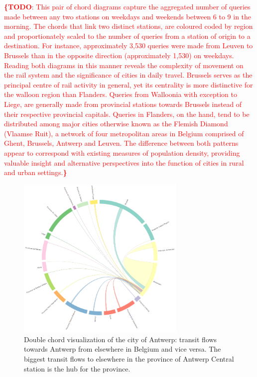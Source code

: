 \documentclass{sig-alternate}
\newcommand{\todo}[1]{\noindent\textcolor{red}{{\bf \{TODO}: #1{\bf \}}}}
\begin{document}
\todo{This pair of chord diagrams capture the aggregated number of queries made between any two stations on weekdays and weekends between 6 to 9 in the morning. The chords that link two distinct stations, are coloured coded by region and proportionately scaled to the number of queries from a station of origin to a destination. For instance, approximately 3,530 queries were made from Leuven to Brussels than in the opposite direction (approximately 1,530) on weekdays. Reading both diagrams in this manner reveals the complexity of movement on the rail system and the significance of cities in daily travel. Brussels serves as the principal centre of rail activity in general, yet its centrality is more distinctive for the walloon region than Flanders. Queries from Walloonia with exception to Liege, are generally made from provincial stations towards Brussels instead of their respective provincial capitals. Queries in Flanders, on the hand, tend to be distributed among major cities otherwise known as the Flemish Diamond (Vlaamse Ruit), a network of four metropolitan areas in Belgium comprised of Ghent, Brussels, Antwerp and Leuven. The difference between both patterns appear to correspond with existing measures of population density, providing valuable insight and alternative perspectives into the function of cities in rural and urban settings.}

\begin{figure}
\centering
\includegraphics[width=8.1cm,align=center]{antwerp}
\caption{Double chord visualization of the city of Antwerp: transit flows towards Antwerp from elsewhere in Belgium and vice versa. The biggest transit flows to elsewhere in the province of Antwerp Central station is the hub for the province.}
\label{fig:antwerp}
\end{figure}
\end{document}

